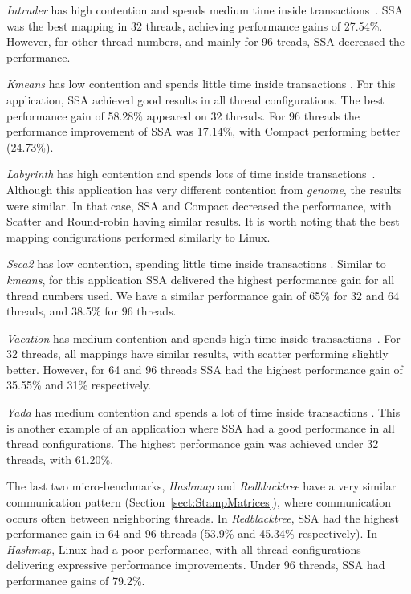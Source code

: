 \emph{Intruder} has high contention and spends medium time inside transactions~\cite{STAMP}. SSA was the best mapping in 32 threads, achieving performance gains of 27.54\%. However, for other thread numbers, and mainly for 96 treads, SSA decreased the performance. 

\emph{Kmeans} has low contention and spends little time inside transactions \cite{STAMP}. For this application, SSA achieved good results in all thread configurations. The best performance gain of 58.28\% appeared on 32 threads. For 96 threads the performance improvement of SSA was 17.14\%, with Compact performing better (24.73\%).

\emph{Labyrinth} has high contention and spends lots of time inside transactions~\cite{STAMP}. Although this application has very different contention from \emph{genome}, the results were similar. In that case, SSA and Compact decreased the performance, with Scatter and Round-robin having similar results. It is worth noting that the best mapping configurations performed similarly to Linux.

\emph{Ssca2} has low contention, spending little time inside transactions \cite{STAMP}. Similar to \emph{kmeans}, for this application SSA delivered the highest performance gain for all thread numbers used. We have a similar performance gain of 65\% for 32 and 64 threads, and 38.5\% for 96 threads.

\emph{Vacation} has medium contention and spends high time inside transactions~\cite{STAMP}. For 32 threads, all mappings have similar results, with scatter performing slightly better. However, for 64 and 96 threads SSA had the highest performance gain of 35.55\% and 31\% respectively.

\emph{Yada} has medium contention and spends a lot of time inside transactions \cite{STAMP}. This is another example of an application where SSA had a good performance in all thread configurations. The highest performance gain was achieved under 32 threads, with 61.20\%. %

The last two micro-benchmarks, \emph{Hashmap} and \emph{Redblacktree} have a very similar communication pattern (Section~\ref{sect:StampMatrices}), where communication occurs often between neighboring threads. In \emph{Redblacktree}, SSA had the highest performance gain in 64 and 96 threads (53.9\% and 45.34\% respectively). In \emph{Hashmap}, Linux had a poor performance, with all thread configurations delivering expressive performance improvements. Under 96 threads, SSA had performance gains of 79.2\%.



